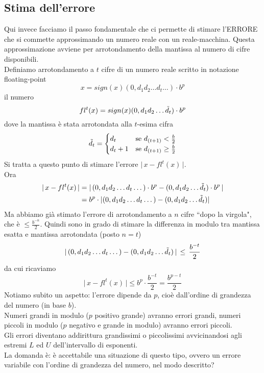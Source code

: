 \documentclass[12pt]{article}
\begin{document}
\subsection{Stima dell'errore}
Qui invece facciamo il passo fondamentale che ci permette di stimare l'ERRORE che si commette approssimando un numero reale con un reale-macchina. Questa approssimazione avviene per arrotondamento della mantissa al numero di cifre disponibili. \\
Definiamo arrotondamento a $t$ cifre di un numero reale scritto in notazione floating-point \[ x = sign(x)(0,d_1 d_2 \dotsc d_t \dotsc) \cdot b^p \]
il numero \[ fl^t(x) = sign(x)(0,d_1 d_2 \dotsc \Tilde{d}_t) \cdot b^p \]
dove la mantissa è stata arrotondata alla $t$-esima cifra
\[\Tilde{d}_t = 
\begin{cases}
    d_t & \text{se $d_{(t+1)} < \frac{b}{2}$} \\
    d_t+1 & \text{se $d_{(t+1)} \ge \frac{b}{2}$}
\end{cases}
\]
Si tratta a questo punto di stimare l'errore $\lvert \, x - fl^t(x) \, \rvert$.\\
Ora
\[ \begin{split}
    \lvert \, x - fl^t(x) \, \rvert & = \lvert \, (0,d_1 d_2 \dotsc d_t \dotsc) \cdot b^p - (0,d_1 d_2 \dotsc \Tilde{d}_t) \cdot b^p \, \rvert \\
    & = b^p \cdot \lvert (0,d_1 d_2 \dotsc d_t \dotsc) - (0,d_1 d_2 \dotsc \Tilde{d}_t) \rvert
    \end{split}\]
Ma abbiamo già stimato l'errore di arrotondamento a $n$ cifre ``dopo la virgola", che è $\le \frac{b^{-n}}{2}$. Quindi sono in grado di stimare la differenza in modulo tra mantissa esatta e mantissa arrotondata (posto $n = t$)
\[ \lvert \, (0,d_1 d_2 \dotsc d_t \dotsc) - (0,d_1 d_2 \dotsc \Tilde{d}_t) \, \rvert \, \le \, \frac{b^{-t}}{2} \] da cui ricaviamo
\[ \lvert \, x - fl^t(x) \, \rvert \le b^p \cdot \frac{b^{-t}}{2} = \frac{b^{p-t}}{2} \]
Notiamo subito un aspetto: l'errore dipende da $p$, cioè dall'ordine di grandezza del numero (in base $b$).\\
Numeri grandi in modulo ($p$ positivo grande) avranno errori grandi, numeri piccoli in modulo ($p$ negativo e grande in modulo) avranno errori piccoli. \\
Gli errori diventano addirittura grandissimi o piccolissimi avvicinandosi agli estremi $L$ ed $U$ dell'intervallo di esponenti. \\
La domanda è: è accettabile una situazione di questo tipo, ovvero un errore variabile con l'ordine di grandezza del numero, nel modo descritto? \\
\end{document}
